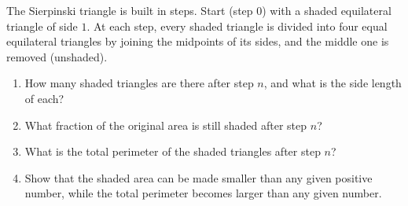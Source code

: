 The Sierpinski triangle is built in steps. Start (step $0$) with a shaded equilateral triangle of side $1$. At each step, every shaded triangle is divided into four equal equilateral triangles by joining the midpoints of its sides, and the middle one is removed (unshaded).
\begin{enumerate}
\item[(a)] How many shaded triangles are there after step $n$, and what is the side length of each?
\item[(b)] What fraction of the original area is still shaded after step $n$?
\item[(c)] What is the total perimeter of the shaded triangles after step $n$?
\item[(d)] Show that the shaded area can be made smaller than any given positive number, while the total perimeter becomes larger than any given number.
\end{enumerate}
